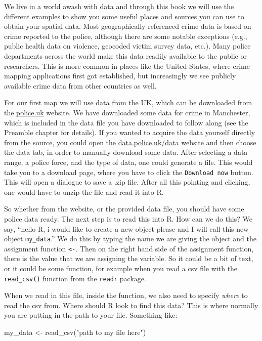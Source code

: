 \documentclass[
]{book}
\newenvironment{Shaded}{\begin{snugshade}}{\end{snugshade}}
\newcommand{\FunctionTok}[1]{\textcolor[rgb]{0.00,0.00,0.00}{#1}}
\newcommand{\NormalTok}[1]{#1}
\newcommand{\OtherTok}[1]{\textcolor[rgb]{0.56,0.35,0.01}{#1}}
\newcommand{\StringTok}[1]{\textcolor[rgb]{0.31,0.60,0.02}{#1}}
\begin{document}
We live in a world awash with data and through this book we will use the different examples to show you some useful places and sources you can use to obtain your spatial data. Most geographically referenced crime data is based on crime reported to the police, although there are some notable exceptions (e.g., public health data on violence, geocoded victim survey data, etc.). Many police departments across the world make this data readily available to the public or researchers. This is more common in places like the United States, where crime mapping applications first got established, but increasingly we see publicly available crime data from other countries as well.

For our first map we will use data from the UK, which can be downloaded from the \href{https://data.police.uk/data/}{police.uk} website. We have downloaded some data for crime in Manchester, which is included in the data file you have downloaded to follow along (see the Preamble chapter for details). If you wanted to acquire the data yourself directly from the source, you could open the \href{https://data.police.uk/data/}{data.police.uk/data} website and then choose the data tab, in order to manually download some data. After selecting a data range, a police force, and the type of data, one could generate a file. This would take you to a download page, where you have to click the \texttt{Download\ now} button. This will open a dialogue to save a .zip file. After all this pointing and clicking, one would have to unzip the file and read it into R.

So whether from the website, or the provided data file, you should have some police data ready. The next step is to read this into R. How can we do this? We say, ``hello R, i would like to create a new object please and I will call this new object \texttt{my\_data}.'' We do this by typing the name we are giving the object and the assignment function \texttt{\textless{}-}. Then on the right hand side of the assignment function, there is the value that we are assigning the variable. So it could be a bit of text, or it could be some function, for example when you read a csv file with the \texttt{read\_csv()} function from the \texttt{readr} package.

When we read in this file, inside the function, we also need to specify \emph{where} to read the csv from. Where should R look to find this data? This is where normally you are putting in the path to your file. Something like:

\begin{Shaded}
\begin{Highlighting}[]
\NormalTok{my\_data }\OtherTok{\textless{}{-}} \FunctionTok{read\_csv}\NormalTok{(}\StringTok{"path to my file here"}\NormalTok{)}
\end{Highlighting}
\end{Shaded}
\end{document}
